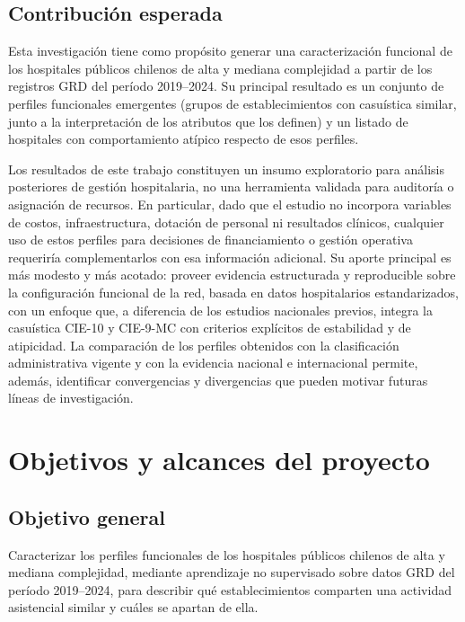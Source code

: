 \subsection{Contribución esperada}
\label{sec:impacto}

Esta investigación tiene como propósito generar una caracterización funcional de
los hospitales públicos chilenos de alta y mediana complejidad a partir de los
registros GRD del período 2019--2024. Su principal resultado es un conjunto de
perfiles funcionales emergentes (grupos de establecimientos con casuística
similar, junto a la interpretación de los atributos que los definen) y un
listado de hospitales con comportamiento atípico respecto de esos perfiles.

Los resultados de este trabajo constituyen un insumo exploratorio para análisis
posteriores de gestión hospitalaria, no una herramienta validada para auditoría
o asignación de recursos. En particular, dado que el estudio no incorpora
variables de costos, infraestructura, dotación de personal ni resultados
clínicos, cualquier uso de estos perfiles para decisiones de financiamiento o
gestión operativa requeriría complementarlos con esa información adicional. Su
aporte principal es más modesto y más acotado: proveer evidencia estructurada y
reproducible sobre la configuración funcional de la red, basada en datos
hospitalarios estandarizados, con un enfoque que, a diferencia de los estudios
nacionales previos, integra la casuística CIE-10 y CIE-9-MC con criterios
explícitos de estabilidad y de atipicidad. La comparación de los perfiles
obtenidos con la clasificación administrativa vigente y con la evidencia
nacional e internacional permite, además, identificar convergencias y
divergencias que pueden motivar futuras líneas de investigación.

\section{Objetivos y alcances del proyecto}
\label{sec:objetivos}

\subsection{Objetivo general}
\label{sec:objetivo-general}

Caracterizar los perfiles funcionales de los hospitales públicos chilenos de
alta y mediana complejidad, mediante aprendizaje no supervisado sobre datos GRD
del período 2019--2024, para describir qué establecimientos comparten una
actividad asistencial similar y cuáles se apartan de ella.

